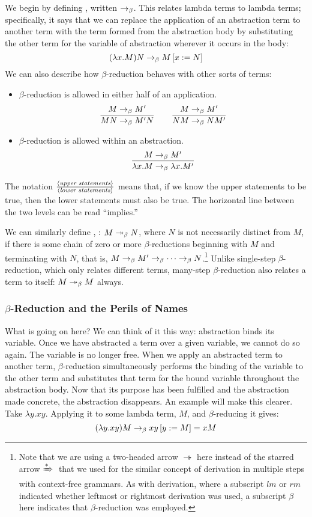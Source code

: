 We begin by defining , written $\betared$. This relates lambda terms to lambda terms; specifically, it says that we can replace the application of an abstraction term to another term with the term formed from the abstraction body by substituting the other term for the variable of abstraction wherever it occurs in the body:
\[
(\lambda x . M) N \betared \replace{x}{N}{M}
\]
We can also describe how $\beta$-re\-duc\-tion behaves with other sorts of terms:
\begin{itemize}
\item $\beta$-re\-duc\-tion is allowed in either half of an application.
\[
\frac{M \betared M\prime}{M N \betared M\prime N}
\qquad
\frac{M \betared M\prime}{N M \betared N M\prime}
\]
\item $\beta$-re\-duc\-tion is allowed within an abstraction.
\[
\frac{M \betared M\prime}{\lambda x.M \betared \lambda x.M\prime}
\]
\end{itemize}
The notation $\frac{\langle\text{\textit{upper statements}}\rangle}{\langle\text{\textit{lower statements}}\rangle}$ means that, if we know the upper statements to be true, then the lower statements must also be true. The horizontal line between the two levels can be read ``implies.''

We can similarly define , \betared[*]: $M \betared[*] N$, where $N$ is not necessarily distinct from $M$, if there is some chain of zero or more $\beta$-re\-duc\-tions beginning with $M$ and terminating with $N$, that is, $M \betared M\prime \betared \dotsb \betared N$.\footnote{Note that we are using a two-headed arrow $\twoheadrightarrow$ here instead of the starred arrow $\derives[*]{}$ that we used for the similar concept of derivation in multiple steps with context-free grammars. As with derivation, where a subscript $lm$ or $rm$ indicated whether leftmost or rightmost derivation was used, a subscript $\beta$ here indicates that $\beta$-re\-duc\-tion was employed.} Unlike single-step $\beta$-re\-duc\-tion, which only relates different terms, many-step $\beta$-re\-duc\-tion also relates a term to itself: $M \betared[*] M$ always.

\subsubsection{\texorpdfstring{$\beta$-Reduction and the Perils of Names}{Beta-Reduction and the Perils of Names}}\label{untyped:nameperils}
What is going on here? We can think of it this way: abstraction binds its variable. Once we have abstracted a term over a given variable, we cannot do so again. The variable is no longer free. When we apply an abstracted term to another term, $\beta$-re\-duc\-tion simultaneously performs the binding of the variable to the other term and substitutes that term for the bound variable throughout the abstraction body. Now that its purpose has been fulfilled and the abstraction made concrete, the abstraction disappears. An example will make this clearer. Take $\lambda y . xy$. Applying it to some lambda term, $M$, and $\beta$-reducing it gives:
\[
(\lambda y . xy) M \betared \replace{y}{M}{xy} = xM
\]

